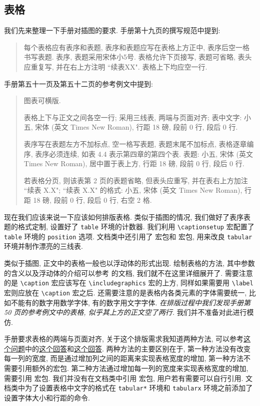 \zhlipsum[1]

\subsection{表格}

我们先来整理一下手册对插图的要求. 手册第十九页的撰写规范中提到:
\begin{quote}
  每个表格应有表序和表题, 表序和表题应写在表格上方正中, 表序后空一格书写表题. 表序, 表题采用宋体小5号. 表格允许下页接写, 表题可省略, 表头应重复写, 并在右上方注明 {``\songti\upshape 续表XX"}. 表格上下均应空一行.
\end{quote}
手册第五十一页及第五十二页的参考例文中提到:
\begin{quote}
  图表可横版.

  表格上下与正文之间各空一行;
  采用三线表, 两端与页面对齐;
  表中文字: 小五, 宋体 (英文 Times New Roman), 行距 18 磅, 段前 0 行, 段后 0 行.

  表序写在表题左方不加标点, 空一格写表题, 表题末尾不加标点, 表格逐章编序, 表序必须连续, 如表 4.4 表示第四章的第四个表. 表题: 小五, 宋体 (英文 Times New Roman), 居中置于表上方, 行距 18 磅, 段前 0 行, 段后 0 行.

  若表格分页, 则该表第 2 页的表题省略, 但表头应重写, 并在表右上方加注 ``续表 X.X";
  ``续表 X.X" 的格式: 小五, 宋体 (英文 Times New Roman), 行距 18 磅, 段前 0 行, 段后 0 行, 右空 2 格.
\end{quote}

现在我们应该来说一下应该如何排版表格. 类似于插图的情况, 我们做好了表序表题的格式定制, 设置好了 \verb|table| 环境的计数器. 我们利用 \verb|\captionsetup| 宏配置了 \verb|table| 环境的 \verb|position| 选项. 文档类中还引用了  宏包和  宏包, 用来改良 \verb|tabular| 环境并制作漂亮的三线表.

类似于插图, 正文中的表格一般也以浮动体的形式出现. 绘制表格的方法, 其中参数的含义以及浮动体的介绍可以参考  的文档, 我们就不在这里详细展开了. 需要注意的是 \verb|\caption| 宏应该写在 \verb|\includegraphics| 宏的上方, 同样如果需要用 \verb|\label| 宏则应放在 \verb|\caption| 宏之后. 还需要注意的是表格内各类元素的字体需要统一, 比如不能有的数字用数学字体, 有的数字用文字字体. \emph{在排版过程中我们发现手册第 50 页的参考例文中的表格, 似乎其上方的正文空了两行.} 我们并不准备对此进行模仿.

手册要求表格的两端与页面对齐, 关于这个排版需求我知道两种方法, 可以参考\href{https://tex.stackexchange.com/questions/10535}{这个问题}中的\href{https://tex.stackexchange.com/a/56552}{这个回答}和\href{https://tex.stackexchange.com/a/10540}{这个回答}. 两种方法的主要区别在于, 第一种方法没有改变每一列的宽度, 而是通过增加列之间的距离来实现表格宽度的增加, 第一种方法不需要引用额外的宏包. 第二种方法通过增加每一列的宽度来实现表格宽度的增加, 需要引用  宏包. 我们并没有在文档类中引用  宏包, 用户若有需要可以自行引用. 文档类中为了设置表格中文字的格式在 \verb|tabular*| 环境和 \verb|tabularx| 环境之前添加了设置字体大小和行距的命令.

